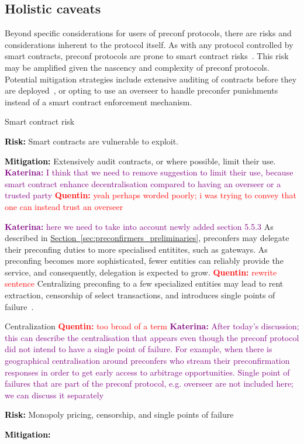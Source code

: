 \documentclass[a4paper]{article}
\theoremstyle{boldstyle}
\newlength{\entrysep}
\newcommand{\risk}[1]{\par\noindent\textbf{\textcolor{black}{Risk:}} #1\par\vspace{\entrysep}}
\newcommand{\mitigation}[1]{\par\noindent\textbf{\textcolor{black}{Mitigation:}} #1}
\newcommand{\qb}[1]{\textcolor{red}{\textbf{Quentin:} #1}}
\newcommand{\ks}[1]{\textcolor{purple}{\textbf{Katerina:} #1}}
\begin{document}
    \subsection{Holistic caveats}
        Beyond specific considerations for users of preconf protocols, there are risks and considerations inherent to the protocol itself. 
        As with any protocol controlled by smart contracts, preconf protocols are prone to smart contract risks~\cite{W:SmartContractVulnerabilitiesandMitigationStrategies}. This risk may be amplified given the nascency and complexity of preconf protocols. Potential mitigation strategies include extensive auditing of contracts before they are deployed~\cite{W:CrediblyNeutralPreconfirmationCollateral:ThePreconfirmationRegistry}, or opting to use an overseer to handle preconfer punishments instead of a smart contract enforcement mechanism.
         \begin{riskbox}{Smart contract risk}
            \risk{Smart contracts are vulnerable to exploit.}
            \mitigation{Extensively audit contracts, or where possible, limit their use.} \ks{I think that we need to remove suggestion to limit their use, because smart contract enhance decentralisation compared to having an overseer or a trusted party} \qb{yeah perhaps worded poorly; i was trying to convey that one can instead trust an overseer}
         \end{riskbox}
         \ks{ here we need to take into account newly added section 5.5.3}
        As described in \hyperref[sec:preconfirmers_preliminaries]{Section~\ref{sec:preconfirmers_preliminaries}}, preconfers may delegate their preconfing duties to more specialised entitites, such as gateways. As preconfing becomes more sophisticated, fewer entities can reliably provide the service, and consequently, delegation is expected to grow. \qb{rewrite sentence} Centralizing preconfing to a few specialized entities may lead to rent extraction, censorship of select transactions, and introduces single points of failure~\cite{W:DelegationinBolt:OutsourcingSophisticationWhilePreservingDecentralization,W:BecomingBased:APathtowardsDecentralisedSequencing}.
        \begin{riskbox}{Centralization \qb{too broad of a term}} \ks{After today's discussion; this can describe the centralisation that appears even though the preconf protocol did not intend to have a single point of failure. For example, when there is geographical centralisation around preconfers who stream their preconfirmation responses in order to get early access to arbitrage opportunities. Single point of failures that are part of the preconf protocol, e.g. overseer are not included here; we can discuss it separately }
            \risk{Monopoly pricing, censorship, and single points of failure}
            \mitigation{}
        \end{riskbox}
\end{document}
